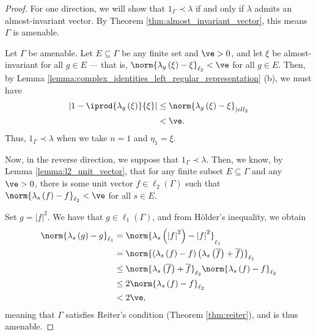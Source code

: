 \begin{proof}
  For one direction, we will show that $1_{\Gamma}\prec \lambda$ if and only if $\lambda$ admits an almost-invariant vector. By Theorem \ref{thm:almost_invariant_vector}, this means $\Gamma$ is amenable.\newline

  Let $\Gamma$ be amenable. Let $E\subseteq \Gamma$ be any finite set and $\ve > 0$, and let $\xi$ be almost-invariant for all $g\in E$ --- that is, $\norm{\lambda_g\left( \xi \right) - \xi}_{\ell_2} < \ve$ for all $g\in E$. Then, by Lemma \ref{lemma:complex_identities_left_regular_representation} (b), we must have
  \begin{align*}
    \left\vert 1 - \iprod{\lambda_g\left( \xi \right)}{\xi} \right\vert &\leq \norm{\lambda_g\left( \xi \right) - \xi}_{|ell_2}\\
    &< \ve.
  \end{align*}
  Thus, $1_{\Gamma}\prec \lambda$ when we take $n = 1$ and $\eta_1 = \xi$.\newline

  Now, in the reverse direction, we suppose that $1_{\Gamma}\prec \lambda$. Then, we know, by Lemma \ref{lemma:l2_unit_vector}, that for any finite subset $E\subseteq \Gamma$ and any $\ve > 0$, there is some unit vector $f\in \ell_2\left( \Gamma \right)$ such that $\norm{\lambda_s\left( f \right) - f}_{\ell_2} < \ve$ for all $s\in E$.\newline

  Set $g = \left\vert f \right\vert^2$. We have that $g\in \ell_1\left( \Gamma \right)$, and from Hölder's inequality, we obtain
  \begin{align*}
    \norm{\lambda_s\left( g \right) - g}_{\ell_1} &= \norm{\lambda_s\left( \left\vert f \right\vert^2 \right) - \left\vert f \right\vert^2}_{\ell_1}\\
                                                  &= \norm{\left( \lambda_s\left( f \right) - f \right)\left( \lambda_s\left( \overline{f} \right) + \overline{f} \right)}_{\ell_1}\\
                                                  &\leq \norm{\lambda_s\left( \overline{f} \right) + \overline{f}}_{\ell_2}\norm{\lambda_s\left( f \right) - f}_{\ell_2}\\
                                                  &\leq 2\norm{\lambda_s\left( f \right) - f}_{\ell_2}\\
                                                  & < 2\ve,
  \end{align*}
  meaning that $\Gamma$ satisfies Reiter's condition (Theorem \ref{thm:reiter}), and is thus amenable.
\end{proof}
